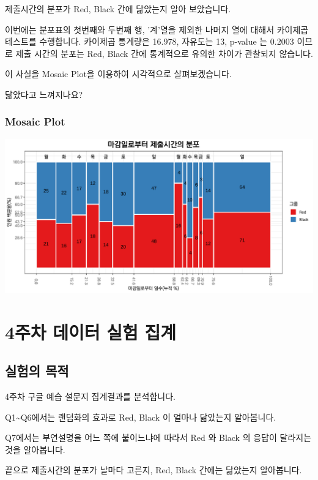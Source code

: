 \documentclass[
]{book}
\begin{document}
제출시간의 분포가 Red, Black 간에 닮았는지 알아 보았습니다.

이번에는 분포표의 첫번째와 두번째 행, '계'열을 제외한 나머지 열에 대해서 카이제곱테스트를 수행합니다.
카이제곱 통계량은 16.978, 자유도는 13, p-value 는 0.2003 이므로 제출 시간의 분포는 Red, Black 간에 통계적으로 유의한 차이가 관찰되지 않습니다.

이 사실을 Mosaic Plot을 이용하여 시각적으로 살펴보겠습니다.

닮았다고 느껴지나요?

\subsection{Mosaic Plot}\label{mosaic-plot-5}

\includegraphics{Quiz_report_2025_files/figure-latex/unnamed-chunk-65-1.pdf}

\chapter{4주차 데이터 실험 집계}\label{uxc8fcuxcc28-uxb370uxc774uxd130-uxc2e4uxd5d8-uxc9d1uxacc4-3}

\section{실험의 목적}\label{uxc2e4uxd5d8uxc758-uxbaa9uxc801-3}

4주차 구글 예습 설문지 집계결과를 분석합니다.

Q1\textasciitilde Q6에서는 랜덤화의 효과로 Red, Black 이 얼마나 닮았는지 알아봅니다.

Q7에서는 부연설명을 어느 쪽에 붙이느냐에 따라서 Red 와 Black 의 응답이 달라지는 것을 알아봅니다.

끝으로 제출시간의 분포가 날마다 고른지, Red, Black 간에는 닮았는지 알아봅니다.
\end{document}
